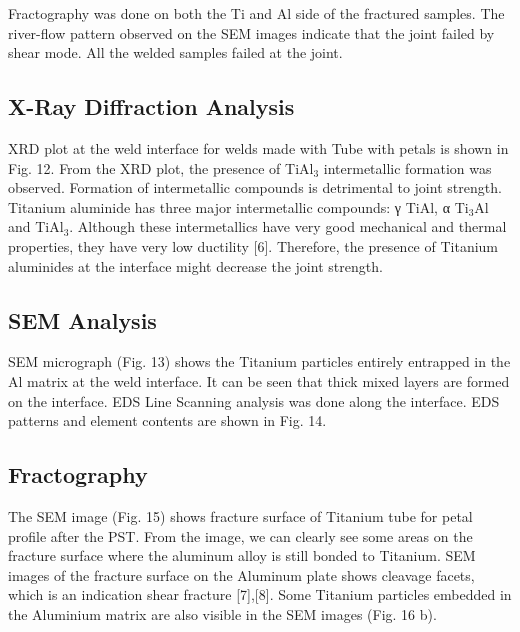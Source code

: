 \documentclass[3p]{elsarticle}
\begin{document}
\par
Fractography was done on both the Ti and Al side of the fractured samples. The river-flow pattern observed on the SEM images indicate that the joint failed by shear mode. All the welded samples failed at the joint.




\subsection{X-Ray Diffraction Analysis}
\label{subsec:XRD-Results}
XRD plot at the weld interface for welds made with Tube with petals is shown in Fig. 12. From the XRD plot, the
presence of TiAl$_{3}$ intermetallic formation was observed. Formation of intermetallic compounds is detrimental to joint strength. Titanium aluminide has three major intermetallic compounds: γ TiAl, α Ti$_{3}$Al and TiAl$_{3}$. Although these intermetallics have very good mechanical and thermal properties, they have very low ductility [6]. Therefore, the presence of Titanium aluminides at the interface might decrease the joint strength.

\subsection{SEM Analysis}
\label{subsec:SEM Analysis}
SEM micrograph (Fig. 13) shows the Titanium particles entirely entrapped in the Al matrix at the weld interface. It can be seen that thick mixed layers are formed on the interface. EDS Line Scanning analysis was done along the interface. EDS patterns and element contents are shown in Fig. 14.

\subsection{Fractography}
\label{subsec:Fractography}
The SEM image (Fig. 15) shows fracture surface of Titanium tube for petal profile after the PST. From the image, we can clearly see some areas on the fracture surface where the aluminum alloy is still bonded to Titanium. SEM images of the fracture surface on the Aluminum plate shows cleavage facets, which is an indication shear fracture [7],[8]. Some Titanium particles embedded in the Aluminium matrix are also visible in
the SEM images (Fig. 16 b).
\end{document}
